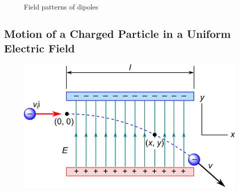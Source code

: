 \documentclass[../../../main.tex]{subfiles}
\begin{document}
\begin{figure}[h]
    \centering
    \qquad
    \caption{Field patterns of dipoles}
\end{figure}

\newpage

\subsection{Motion of a Charged Particle in a Uniform Electric Field}

\begin{figure}[h]
    \centering
    \includegraphics{figures/6.png}
\end{figure}
\end{document}
